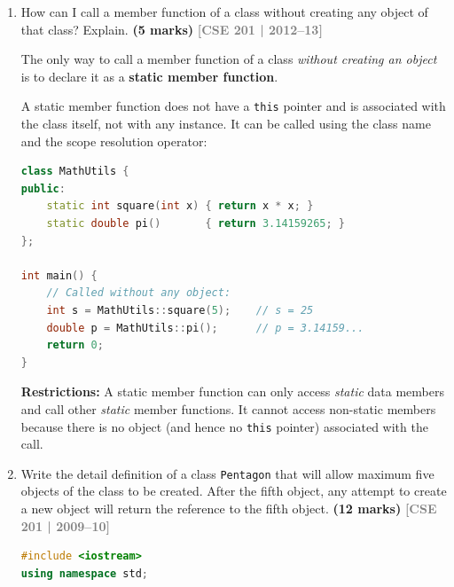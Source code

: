 \documentclass[12pt,a3paper]{article}
\newcommand{\yr}[1]{\hfill\textcolor{gray}{\small\textbf{[#1]}}}
\newcommand{\mk}[1]{\textcolor{orange!70!black}{\small\textbf{(#1 marks)}}}
\begin{document}
\begin{enumerate}
\item How can I call a member function of a class without creating any object of that class? Explain. \mk{5}
\yr{CSE 201 | 2012--13}

\begin{tcolorbox}[enhanced,breakable,ansbox,colback=cB!4,colframe=cB,
  boxrule=0.8pt,arc=5pt,
  title={\textbf{Answer}},fonttitle=\bfseries\color{white},colbacktitle=cB]

The only way to call a member function of a class \emph{without
creating an object} is to declare it as a \textbf{static member
function}.

A static member function does not have a \texttt{this} pointer and
is associated with the class itself, not with any instance.  It can
be called using the class name and the scope resolution operator:

\begin{lstlisting}[language=C++]
class MathUtils {
public:
    static int square(int x) { return x * x; }
    static double pi()       { return 3.14159265; }
};

int main() {
    // Called without any object:
    int s = MathUtils::square(5);    // s = 25
    double p = MathUtils::pi();      // p = 3.14159...
    return 0;
}
\end{lstlisting}

\textbf{Restrictions:} A static member function can only access
\emph{static} data members and call other \emph{static} member
functions.  It cannot access non-static members because there is no
object (and hence no \texttt{this} pointer) associated with the call.

\end{tcolorbox}

\item Write the detail definition of a class \texttt{Pentagon} that will allow maximum five objects of the class to be created. After the fifth object, any attempt to create a new object will return the reference to the fifth object. \mk{12}
\yr{CSE 201 | 2009--10}

\begin{tcolorbox}[enhanced,breakable,ansbox,colback=cB!4,colframe=cB,
  boxrule=0.8pt,arc=5pt,
  title={\textbf{Answer}},fonttitle=\bfseries\color{white},colbacktitle=cB]

\begin{lstlisting}[language=C++]
#include <iostream>
using namespace std;


\end{lstlisting}
\end{tcolorbox}
\end{enumerate}
\end{document}
